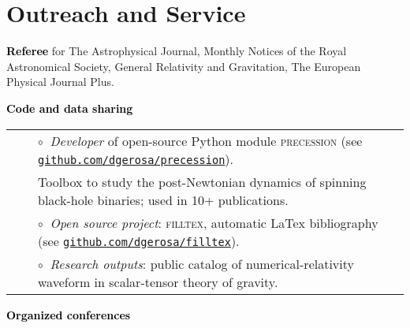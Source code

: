 \documentclass[11pt,letterpaper,sans]{moderncv}
\begin{document}

\section{Outreach and Service}

\textbf{\textcolor{black}{Referee}} for The Astrophysical Journal, Monthly Notices of the Royal Astronomical Society, General Relativity and Gravitation, The European Physical Journal Plus.

\vspace{0.2cm}
\textbf{\textcolor{black}{Code and data sharing}}\vspace{0.05cm}\\ 
\begin{tabular}{rcl}
&\hspace{0.4cm} &$\circ\;\;${\textit{Developer}} of open-source Python module \textsc{precession} (see \href{https://github.com/dgerosa/precession}{\texttt{github.com/dgerosa/precession}}). 
\\ &\hspace{0.4cm} &  \hspace{0.4cm}Toolbox to study the post-Newtonian dynamics of  spinning black-hole binaries; used in 10+  publications. \\ 
&\hspace{0.4cm} &$\circ\;\;${\textit{Open source project}}: \textsc{filltex}, automatic LaTex bibliography (see \href{https://github.com/dgerosa/filltex}{\texttt{github.com/dgerosa/filltex}}).\\
&\hspace{0.4cm} &$\circ\;\;${\textit{Research outputs}}: public catalog of numerical-relativity waveform in scalar-tensor theory of gravity.\\
\end{tabular}

\vspace{0.2cm}

\textbf{\textcolor{black}{Organized conferences}}\vspace{0.05cm}\\ 
 \vspace{-0.1cm}
 \vspace{-0.1cm}
 \vspace{-0.1cm}
 \vspace{-0.1cm}
\end{document}

